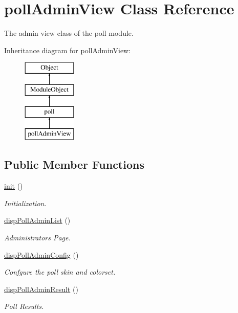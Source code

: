 \hypertarget{classpollAdminView}{}\section{poll\+Admin\+View Class Reference}
\label{classpollAdminView}


The admin view class of the poll module.  


Inheritance diagram for poll\+Admin\+View\+:\begin{figure}[H]
\begin{center}
\leavevmode
\includegraphics[height=4.000000cm]{classpollAdminView}
\end{center}
\end{figure}
\subsection*{Public Member Functions}
\begin{DoxyCompactItemize}
\item 
\hyperlink{classpollAdminView_af5d64cefd4797770bd159956c19bb48b}{init} ()
\begin{DoxyCompactList}\small\item\em Initialization. \end{DoxyCompactList}\item 
\hyperlink{classpollAdminView_a6c6fb22f667d20327d6770a3227c2875}{disp\+Poll\+Admin\+List} ()
\begin{DoxyCompactList}\small\item\em Administrator\textquotesingle{}s Page. \end{DoxyCompactList}\item 
\hyperlink{classpollAdminView_a187abafd38bcaa2b0f72b4f08e667be8}{disp\+Poll\+Admin\+Config} ()
\begin{DoxyCompactList}\small\item\em Confgure the poll skin and colorset. \end{DoxyCompactList}\item 
\hyperlink{classpollAdminView_ae05b1788a9f40401af695a961137663a}{disp\+Poll\+Admin\+Result} ()
\begin{DoxyCompactList}\small\item\em Poll Results. \end{DoxyCompactList}\end{DoxyCompactItemize}
